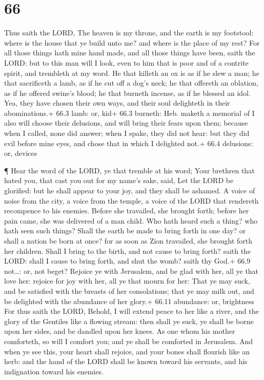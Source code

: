 \hypertarget{section-65}{%
\section{66}\label{section-65}}

 Thus saith the LORD, The heaven is my throne, and the earth
is my footstool: where is the house that ye build unto me? and where is
the place of my rest?  For all those things hath mine hand
made, and all those things have been, saith the LORD: but to this man
will I look, even to him that is poor and of a contrite spirit, and
trembleth at my word.  He that killeth an ox is as if he
slew a man; he that sacrificeth a lamb, as if he cut off a dog's neck;
he that offereth an oblation, as if he offered swine's blood; he that
burneth incense, as if he blessed an idol. Yea, they have chosen their
own ways, and their soul delighteth in their abominations.+ 66.3 lamb:
or, kid+ 66.3 burneth: Heb. maketh a memorial of  I also
will choose their delusions, and will bring their fears upon them;
because when I called, none did answer; when I spake, they did not hear:
but they did evil before mine eyes, and chose that in which I delighted
not.+ 66.4 delusions: or, devices

 ¶ Hear the word of the LORD, ye that tremble at his word;
Your brethren that hated you, that cast you out for my name's sake,
said, Let the LORD be glorified: but he shall appear to your joy, and
they shall be ashamed.  A voice of noise from the city, a
voice from the temple, a voice of the LORD that rendereth recompence to
his enemies.  Before she travailed, she brought forth;
before her pain came, she was delivered of a man child.  Who
hath heard such a thing? who hath seen such things? Shall the earth be
made to bring forth in one day? or shall a nation be born at once? for
as soon as Zion travailed, she brought forth her children. 
Shall I bring to the birth, and not cause to bring forth? saith the
LORD: shall I cause to bring forth, and shut the womb? saith thy God.+
66.9 not\ldots: or, not beget?  Rejoice ye with Jerusalem,
and be glad with her, all ye that love her: rejoice for joy with her,
all ye that mourn for her:  That ye may suck, and be
satisfied with the breasts of her consolations; that ye may milk out,
and be delighted with the abundance of her glory.+ 66.11 abundance: or,
brightness  For thus saith the LORD, Behold, I will extend
peace to her like a river, and the glory of the Gentiles like a flowing
stream: then shall ye suck, ye shall be borne upon her sides, and be
dandled upon her knees.  As one whom his mother comforteth,
so will I comfort you; and ye shall be comforted in Jerusalem.
 And when ye see this, your heart shall rejoice, and your
bones shall flourish like an herb: and the hand of the LORD shall be
known toward his servants, and his indignation toward his enemies.

